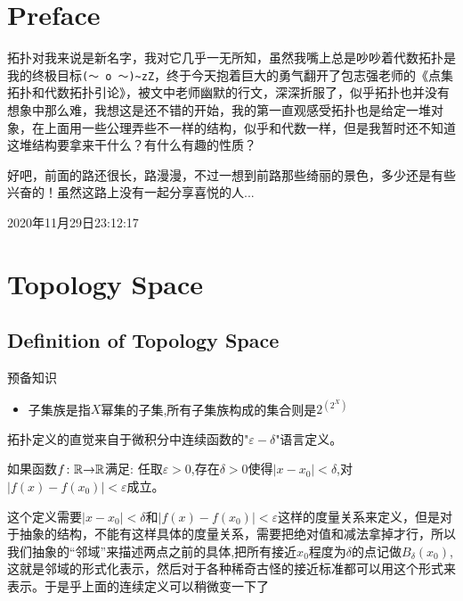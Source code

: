 \tableofcontents

\newpage

\section{Preface}

拓扑对我来说是新名字，我对它几乎一无所知，虽然我嘴上总是吵吵着代数拓扑是我的终极目标\verb|(～ o ～)~zZ|，终于今天抱着巨大的勇气翻开了包志强老师的《点集拓扑和代数拓扑引论》，被文中老师幽默的行文，深深折服了，似乎拓扑也并没有想象中那么难，我想这是还不错的开始，我的第一直观感受拓扑也是给定一堆对象，在上面用一些公理弄些不一样的结构，似乎和代数一样，但是我暂时还不知道这堆结构要拿来干什么？有什么有趣的性质？

好吧，前面的路还很长，路漫漫，不过一想到前路那些绮丽的景色，多少还是有些兴奋的！虽然这路上没有一起分享喜悦的人...

2020年11月29日23:12:17
\newpage

\section{Topology Space}
\subsection{Definition of Topology Space} 
预备知识

\begin{itemize}
	\item 子集族是指$X$幂集的子集,所有子集族构成的集合则是$2^{(2^X)}$				
\end{itemize}


拓扑定义的直觉来自于微积分中连续函数的"$\varepsilon-\delta$"语言定义。

\begin{definition}
如果函数${f}\colon{\mathbb{R}}{\to}{\mathbb{R}}$满足: 任取$\varepsilon > 0$,存在$\delta > 0$使得$|x-x_0| < \delta$,对$|f(x)-f(x_0)| < \varepsilon$成立。
\end{definition}

这个定义需要$|x-x_0| < \delta$和$|f(x)-f(x_0)| < \varepsilon$这样的度量关系来定义，但是对于抽象的结构，不能有这样具体的度量关系，需要把绝对值和减法拿掉才行，所以我们抽象的“邻域”来描述两点之前的具体,把所有接近$x_0$程度为$\delta$的点记做$B_{\delta}(x_0)$,这就是邻域的形式化表示，然后对于各种稀奇古怪的接近标准都可以用这个形式来表示。于是乎上面的连续定义可以稍微变一下了

